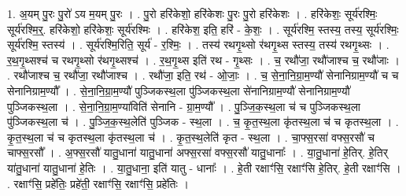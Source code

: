 \documentclass[17pt]{extarticle}
\begin{document}
1. अ॒यम् पु॒रः पु॒रो॑ ऽय म॒यम् पु॒रः । . पु॒रो हरि॑केशो॒ हरि॑केशः पु॒रः पु॒रो हरि॑केशः । . हरि॑केशः॒ सूर्य॑रश्मिः॒ सूर्य॑रश्मि॒र्॒. हरि॑केशो॒ हरि॑केशः॒ सूर्य॑रश्मिः । . हरि॑केश॒ इति॒ हरि॑ - के॒शः॒ । . सूर्य॑रश्मि॒ स्तस्य॒ तस्य॒ सूर्य॑रश्मिः॒ सूर्य॑रश्मि॒ स्तस्य॑ । . सूर्य॑रश्मि॒रिति॒ सूर्य॑ - र॒श्मिः॒ । . तस्य॑ रथगृ॒थ्सो र॑थगृ॒थ्स स्तस्य॒ तस्य॑ रथगृ॒थ्सः । . र॒थ॒गृ॒थ्सश्च॑ च रथगृ॒थ्सो र॑थगृ॒थ्सश्च॑ । . र॒थ॒गृ॒थ्स इति॑ रथ - गृ॒थ्सः । . च॒ रथौ॑जा॒ रथौ॑जाश्च च॒ रथौ॑जाः । . रथौ॑जाश्च च॒ रथौ॑जा॒ रथौ॑जाश्च । . रथौ॑जा॒ इति॒ रथ॑ - ओ॒जाः॒ । . च॒ से॒ना॒नि॒ग्रा॒म॒ण्यौ॑ सेनानिग्राम॒ण्यौ॑ च च सेनानिग्राम॒ण्यौ᳚ । . से॒ना॒नि॒ग्रा॒म॒ण्यौ॑ पुञ्जिकस्थ॒ला पु॑ञ्जिकस्थ॒ला से॑नानिग्राम॒ण्यौ॑ सेनानिग्राम॒ण्यौ॑ पुञ्जिकस्थ॒ला । . से॒ना॒नि॒ग्रा॒म॒ण्या॑विति॑ सेनानि - ग्रा॒म॒ण्यौ᳚ । . पु॒ञ्जि॒क॒स्थ॒ला च॑ च पुञ्जिकस्थ॒ला पु॑ञ्जिकस्थ॒ला च॑ । . पु॒ञ्जि॒क॒स्थ॒लेति॑ पुञ्जिक - स्थ॒ला । . च॒ कृ॒त॒स्थ॒ला कृ॑तस्थ॒ला च॑ च कृतस्थ॒ला । . कृ॒त॒स्थ॒ला च॑ च कृतस्थ॒ला कृ॑तस्थ॒ला च॑ । . कृ॒त॒स्थ॒लेति॑ कृत - स्थ॒ला । . चा॒फ्स॒रसा॑ वफ्स॒रसौ॑ च चाफ्स॒रसौ᳚ । . अ॒फ्स॒रसौ॑ यातु॒धाना॑ यातु॒धाना॑ अफ्स॒रसा॑ वफ्स॒रसौ॑ यातु॒धानाः᳚ । . या॒तु॒धाना॑ हे॒तिर्. हे॒तिर् या॑तु॒धाना॑ यातु॒धाना॑ हे॒तिः । . या॒तु॒धाना॒ इति॑ यातु - धानाः᳚ । . हे॒ती रक्षाꣳ॑सि॒ रक्षाꣳ॑सि हे॒तिर्. हे॒ती रक्षाꣳ॑सि । . रक्षाꣳ॑सि॒ प्रहे॑तिः॒ प्रहे॑ती॒ रक्षाꣳ॑सि॒ रक्षाꣳ॑सि॒ प्रहे॑तिः । \newline
\end{document}
